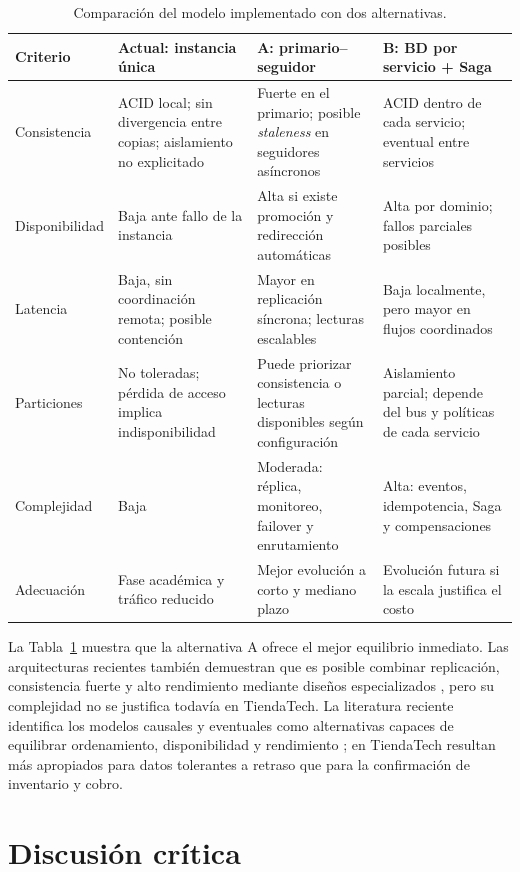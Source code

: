 \documentclass[11pt,a4paper]{article}
\begin{document}
\begin{table}[htbp]
\centering
\caption{Comparación del modelo implementado con dos alternativas.}
\label{tab:comparacion}
\small
\begin{tabularx}{\textwidth}{>{\raggedright\arraybackslash}p{2.5cm}XXX}
\toprule
\textbf{Criterio} & \textbf{Actual: instancia única} & \textbf{A: primario--seguidor} & \textbf{B: BD por servicio + Saga} \\
\midrule
Consistencia & ACID local; sin divergencia entre copias; aislamiento no explicitado & Fuerte en el primario; posible \emph{staleness} en seguidores asíncronos & ACID dentro de cada servicio; eventual entre servicios \\
Disponibilidad & Baja ante fallo de la instancia & Alta si existe promoción y redirección automáticas & Alta por dominio; fallos parciales posibles \\
Latencia & Baja, sin coordinación remota; posible contención & Mayor en replicación síncrona; lecturas escalables & Baja localmente, pero mayor en flujos coordinados \\
Particiones & No toleradas; pérdida de acceso implica indisponibilidad & Puede priorizar consistencia o lecturas disponibles según configuración & Aislamiento parcial; depende del bus y políticas de cada servicio \\
Complejidad & Baja & Moderada: réplica, monitoreo, failover y enrutamiento & Alta: eventos, idempotencia, Saga y compensaciones \\
Adecuación & Fase académica y tráfico reducido & Mejor evolución a corto y mediano plazo & Evolución futura si la escala justifica el costo \\
\bottomrule
\end{tabularx}
\end{table}

La Tabla~\ref{tab:comparacion} muestra que la alternativa A ofrece el mejor equilibrio inmediato. Las arquitecturas recientes también demuestran que es posible combinar replicación, consistencia fuerte y alto rendimiento mediante diseños especializados \cite{krechowicz2025layered}, pero su complejidad no se justifica todavía en TiendaTech. La literatura reciente identifica los modelos causales y eventuales como alternativas capaces de equilibrar ordenamiento, disponibilidad y rendimiento \cite{ahmed2023tradeoffs}; en TiendaTech resultan más apropiados para datos tolerantes a retraso que para la confirmación de inventario y cobro.

\section{Discusión crítica}
\end{document}

